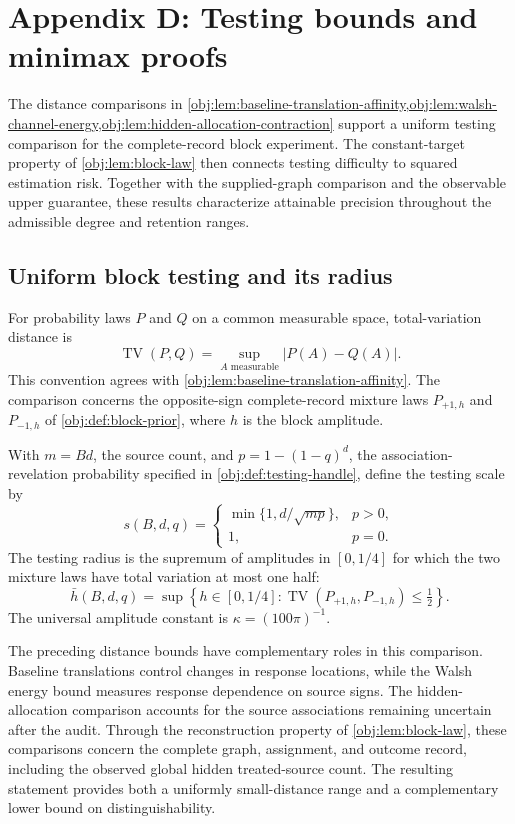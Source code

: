 \section{Appendix D: Testing bounds and minimax proofs}

The distance comparisons in \cref{obj:lem:baseline-translation-affinity,obj:lem:walsh-channel-energy,obj:lem:hidden-allocation-contraction} support a uniform testing comparison for the complete-record block experiment. The constant-target property of \cref{obj:lem:block-law} then connects testing difficulty to squared estimation risk. Together with the supplied-graph comparison and the observable upper guarantee, these results characterize attainable precision throughout the admissible degree and retention ranges.

\subsection{Uniform block testing and its radius}

For probability laws \(P\) and \(Q\) on a common measurable space, total-variation distance is
\[
\operatorname{TV}(P,Q)
=\sup_{A\text{ measurable}}|P(A)-Q(A)|.
\]
This convention agrees with \cref{obj:lem:baseline-translation-affinity}. The comparison concerns the opposite-sign complete-record mixture laws \(P_{+1,h}\) and \(P_{-1,h}\) of \cref{obj:def:block-prior}, where \(h\) is the block amplitude.

With \(m=Bd\), the source count, and \(p=1-(1-q)^d\), the association-revelation probability specified in \cref{obj:def:testing-handle}, define the testing scale by
\[
s(B,d,q)=
\begin{cases}
\min\{1,d/\sqrt{mp}\},&p>0,\\
1,&p=0.
\end{cases}
\]
The testing radius is the supremum of amplitudes in \([0,1/4]\) for which the two mixture laws have total variation at most one half:
\[
\bar h(B,d,q)
=\sup\left\{h\in[0,1/4]:
\operatorname{TV}(P_{+1,h},P_{-1,h})\le\tfrac12\right\}.
\]
The universal amplitude constant is \(\kappa=(100\pi)^{-1}\).

The preceding distance bounds have complementary roles in this comparison. Baseline translations control changes in response locations, while the Walsh energy bound measures response dependence on source signs. The hidden-allocation comparison accounts for the source associations remaining uncertain after the audit. Through the reconstruction property of \cref{obj:lem:block-law}, these comparisons concern the complete graph, assignment, and outcome record, including the observed global hidden treated-source count. The resulting statement provides both a uniformly small-distance range and a complementary lower bound on distinguishability.

